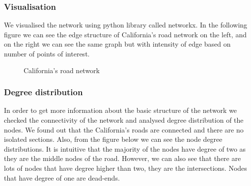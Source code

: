 \documentclass[11pt]{article}
\begin{document}
\subsubsection{Visualisation}
We visualised the network using python library called networkx. In the following figure we can see the edge structure of California's road network on the left, and on the right we can see the same graph but with intensity of edge based on number of points of interest.
\begin{figure}[h!]
    \centering
    \caption{California's road network}%
    \qquad
\end{figure}




\subsubsection{Degree distribution}
In order to get more information about the basic structure of the network we checked the connectivity of the network and analysed degree distribution of the nodes. We found out that the California's roads are connected and there are no isolated sections. Also, from the figure below we can see the node degree distributions. It is intuitive that the majority of the nodes have degree of two as they are the middle nodes of the road. However, we can also see that there are lots of nodes that have degree higher than two, they are the intersections. Nodes that have degree of one are dead-ends.
\end{document}
